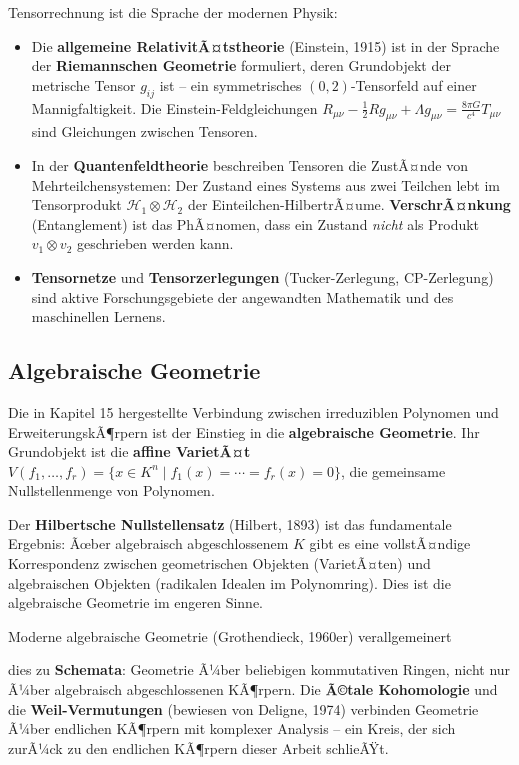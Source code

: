 ﻿\documentclass[a4paper,12pt]{report}
\theoremstyle{definition}
\begin{document}
Tensorrechnung ist die Sprache der modernen Physik:
\begin{itemize}
    \item[-] Die \textbf{allgemeine RelativitÃ¤tstheorie} (Einstein, 1915)
          ist in der Sprache der \textbf{Riemannschen Geometrie}
          formuliert, deren Grundobjekt der metrische Tensor $g_{ij}$
          ist -- ein symmetrisches $(0,2)$-Tensorfeld auf einer
          Mannigfaltigkeit. Die Einstein-Feldgleichungen
          $R_{\mu\nu} - \frac{1}{2}Rg_{\mu\nu} + \Lambda g_{\mu\nu}
          = \frac{8\pi G}{c^4} T_{\mu\nu}$ sind Gleichungen zwischen
          Tensoren.
    \item[-] In der \textbf{Quantenfeldtheorie} beschreiben
          Tensoren die ZustÃ¤nde von Mehrteilchensystemen: Der
          Zustand eines Systems aus zwei Teilchen lebt im
          Tensorprodukt $\mathcal{H}_1 \otimes \mathcal{H}_2$
          der Einteilchen-HilbertrÃ¤ume. \textbf{VerschrÃ¤nkung}
          (Entanglement) ist das PhÃ¤nomen, dass ein Zustand
          \emph{nicht} als Produkt $v_1 \otimes v_2$ geschrieben
          werden kann.
    \item[-] \textbf{Tensornetze} und \textbf{Tensorzerlegungen}
          (Tucker-Zerlegung, CP-Zerlegung) sind aktive
          Forschungsgebiete der angewandten Mathematik und des
          maschinellen Lernens.
\end{itemize}

\subsection*{Algebraische Geometrie}

Die in Kapitel 15 hergestellte Verbindung zwischen irreduziblen
Polynomen und ErweiterungskÃ¶rpern ist der Einstieg in die
\textbf{algebraische Geometrie}. Ihr Grundobjekt ist die
\textbf{affine VarietÃ¤t}
$V(f_1, \ldots, f_r) = \{x \in K^n \mid f_1(x) = \cdots = f_r(x) = 0\}$,
die gemeinsame Nullstellenmenge von Polynomen.

Der \textbf{Hilbertsche Nullstellensatz} (Hilbert, 1893) ist das
fundamentale Ergebnis: Ãœber algebraisch abgeschlossenem $K$ gibt es
eine vollstÃ¤ndige Korrespondenz zwischen geometrischen Objekten
(VarietÃ¤ten) und algebraischen Objekten (radikalen Idealen im
Polynomring). Dies ist die algebraische Geometrie im engeren Sinne.

Moderne algebraische Geometrie (Grothen\-dieck, 1960er) verall\-gemeinert

dies zu \textbf{Schemata}: Geometrie Ã¼ber beliebigen kommutativen
Ringen, nicht nur Ã¼ber algebraisch abgeschlossenen KÃ¶rpern.
Die \textbf{Ã©tale Kohomologie} und die \textbf{Weil-Ver\-mutungen}
(bewiesen von Deligne, 1974) verbinden Geometrie Ã¼ber endlichen
KÃ¶rpern mit komplexer Analysis -- ein Kreis, der sich zurÃ¼ck zu den
endlichen KÃ¶rpern dieser Arbeit schlieÃŸt.
\end{document}

